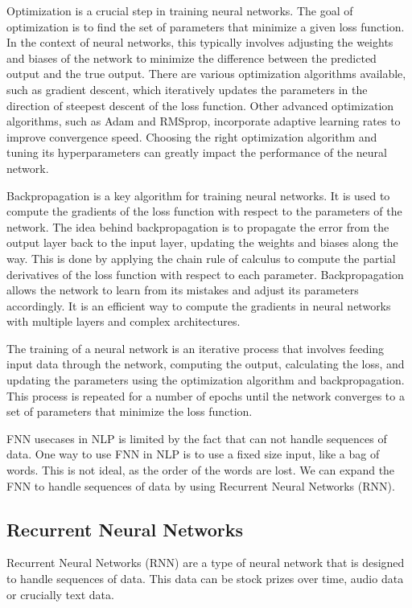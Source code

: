 Optimization is a crucial step in training neural networks. 
The goal of optimization is to find the set of parameters that minimize a given loss function. 
In the context of neural networks, this typically involves adjusting the weights and biases of the network to minimize the difference between the predicted output and the true output.
There are various optimization algorithms available, such as gradient descent, which iteratively updates the parameters in the direction of steepest descent of the loss function.
Other advanced optimization algorithms, such as Adam and RMSprop, incorporate adaptive learning rates to improve convergence speed. 
Choosing the right optimization algorithm and tuning its hyperparameters can greatly impact the performance of the neural network.

Backpropagation is a key algorithm for training neural networks. 
It is used to compute the gradients of the loss function with respect to the parameters of the network. 
The idea behind backpropagation is to propagate the error from the output layer back to the input layer, updating the weights and biases along the way.
This is done by applying the chain rule of calculus to compute the partial derivatives of the loss function with respect to each parameter.
Backpropagation allows the network to learn from its mistakes and adjust its parameters accordingly.
It is an efficient way to compute the gradients in neural networks with multiple layers and complex architectures. 

The training of a neural network is an iterative process that involves feeding input data through the network,
computing the output, calculating the loss, and updating the parameters using the optimization algorithm 
and backpropagation. This process is repeated for a number of epochs until the network converges to a set of parameters that minimize the loss function.


FNN usecases in NLP is limited by the fact that can not handle sequences of data.
One way to use FNN in NLP is to use a fixed size input, like a bag of words.
This is not ideal, as the order of the words are lost.
We can expand the FNN to handle sequences of data by using Recurrent Neural Networks (RNN).

\subsection{Recurrent Neural Networks}
Recurrent Neural Networks (RNN) are a type of neural network that is designed to handle sequences of data.
This data can be stock prizes over time, audio data or crucially text data.

